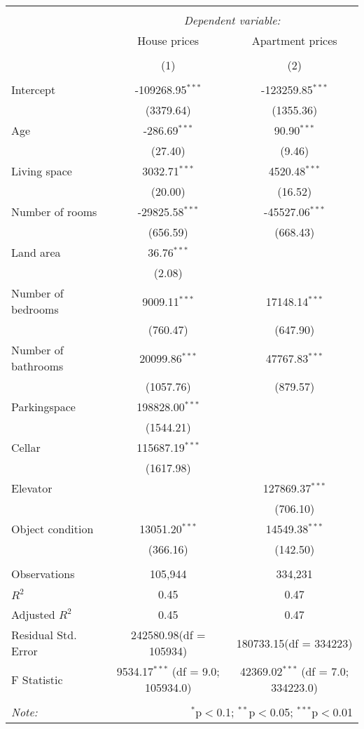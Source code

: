 \begin{table}[!htbp] \centering
\begin{tabular}{@{\extracolsep{5pt}}lcc}
\\[-1.8ex]\hline
\hline \\[-1.8ex]
& \multicolumn{2}{c}{\textit{Dependent variable:}} \
\cr \cline{2-3}
\\[-1.8ex] & \multicolumn{1}{c}{House prices} & \multicolumn{1}{c}{Apartment prices}  \\
\\[-1.8ex] & (1) & (2) \\
\hline \\[-1.8ex]
 Intercept & -109268.95$^{***}$ & -123259.85$^{***}$ \\
  & (3379.64) & (1355.36) \\
 Age & -286.69$^{***}$ & 90.90$^{***}$ \\
  & (27.40) & (9.46) \\
 Living space & 3032.71$^{***}$ & 4520.48$^{***}$ \\
  & (20.00) & (16.52) \\
 Number of rooms & -29825.58$^{***}$ & -45527.06$^{***}$ \\
  & (656.59) & (668.43) \\
 Land area & 36.76$^{***}$ & \\
  & (2.08) & \\
 Number of bedrooms & 9009.11$^{***}$ & 17148.14$^{***}$ \\
  & (760.47) & (647.90) \\
 Number of bathrooms & 20099.86$^{***}$ & 47767.83$^{***}$ \\
  & (1057.76) & (879.57) \\
 Parkingspace & 198828.00$^{***}$ & \\
  & (1544.21) & \\
 Cellar & 115687.19$^{***}$ & \\
  & (1617.98) & \\
 Elevator & & 127869.37$^{***}$ \\
  & & (706.10) \\
 Object condition & 13051.20$^{***}$ & 14549.38$^{***}$ \\
  & (366.16) & (142.50) \\
\hline \\[-1.8ex]
 Observations & 105,944 & 334,231 \\
 $R^2$ & 0.45 & 0.47 \\
 Adjusted $R^2$ & 0.45 & 0.47 \\
 Residual Std. Error & 242580.98(df = 105934) & 180733.15(df = 334223)  \\
 F Statistic & 9534.17$^{***}$ (df = 9.0; 105934.0) & 42369.02$^{***}$ (df = 7.0; 334223.0) \\
\hline
\hline \\[-1.8ex]
\textit{Note:} & \multicolumn{2}{r}{$^{*}$p$<$0.1; $^{**}$p$<$0.05; $^{***}$p$<$0.01} \\
\end{tabular}
\end{table}